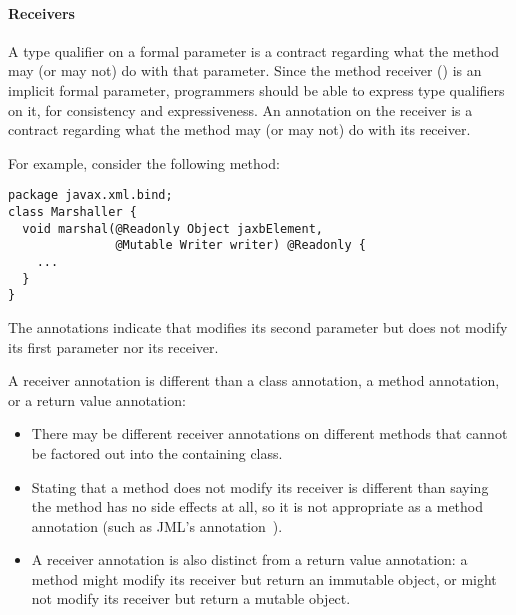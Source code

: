 \documentclass[10pt]{article}
\begin{document}
\paragraph{Receivers\label{receivers}}
A type qualifier on a formal parameter is a contract regarding what the
method may (or may not) do with that parameter.  Since the method receiver
() is an implicit formal parameter, programmers should be able
to express type qualifiers on it, for consistency and expressiveness.  An
annotation on the receiver is a contract regarding what the method may
(or may not) do with its receiver.



For example, consider the following method:

\begin{Verbatim}
package javax.xml.bind;
class Marshaller {
  void marshal(@Readonly Object jaxbElement,
               @Mutable Writer writer) @Readonly {
    ...
  }
}
\end{Verbatim}

\noindent
The annotations indicate that  modifies its second parameter
but does not modify its first parameter nor its receiver.

A receiver annotation is different than a class annotation, a method
annotation, or a return value annotation:
\begin{itemize}
\item
  There may be different receiver annotations on different methods that
  cannot be factored out into the containing class.

\item
  Stating that a method does not modify its receiver is different than
  saying the method has no side effects at all, so it is not appropriate as
  a method annotation (such as JML's 
  annotation~\cite{LeavensBR2006:JML}).

\item
  A receiver annotation is also distinct from a return value
  annotation:  a method might modify its receiver but return an immutable
  object, or might not modify its receiver but return a mutable object.
\end{itemize}

% 
% 
\end{document}
